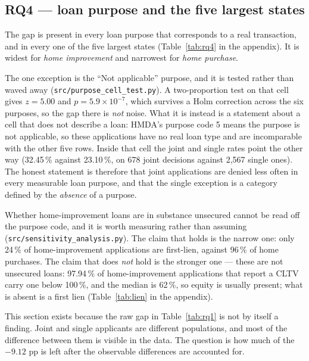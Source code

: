 \documentclass[sigconf,balance=false]{acmart}
\begin{document}
\subsection{RQ4 --- loan purpose and the five largest states}\label{sec:rq4}



The gap is present in every loan purpose that corresponds to a real
transaction, and in every one of the five largest states (Table~\ref{tab:rq4}
in the appendix). It is widest for \emph{home improvement} and narrowest for
\emph{home purchase}.

The one exception is the ``Not applicable'' purpose, and it is tested rather
than waved away (\texttt{src/purpose\_\allowbreak cell\_\allowbreak test.py}).
A two-proportion test on that cell gives $z = 5.00$ and
$p = 5.9 \times 10^{-7}$, which survives a Holm correction across the six
purposes, so the gap there is \emph{not} noise. What it is instead is a
statement about a cell that does not describe a loan: HMDA's purpose code 5
means the purpose is not applicable, so these applications have no real
loan type and are incomparable with the other five rows. Inside that cell
the joint and single rates point the other way (32.45\,\% against
23.10\,\%, on 678 joint decisions against 2{,}567 single ones). The honest
statement is therefore that joint applications are denied less often in
every measurable loan purpose, and that the single exception is a category
defined by the \emph{absence} of a purpose.

Whether home-improvement loans are in substance unsecured cannot be read off
the purpose code, and it is worth measuring rather than assuming
(\texttt{src/sensitivity\_\allowbreak analysis.py}). The claim that holds is
the narrow one: only 24\,\% of home-improvement applications are
first-lien, against 96\,\% of home purchases. The claim that does
\emph{not} hold is the stronger one --- these are not unsecured loans:
97.94\,\% of home-improvement applications that report a CLTV carry one
below 100\,\%, and the median is 62\,\%, so equity is usually present;
what is absent is a first lien (Table~\ref{tab:lien} in the appendix).


This section exists because the raw gap in Table~\ref{tab:rq1} is not by
itself a finding. Joint and single applicants are different populations, and
most of the difference between them is visible in the data. The question is
how much of the $-9.12$ pp is left after the observable differences are
accounted for.
\end{document}
